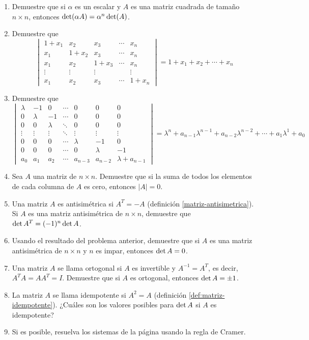 \begin{enumerate}[start=31]
    \item Demuestre que si $\alpha$ es un escalar y $A$ es una matriz cuadrada de tamaño $n \times n$, entonces $\operatorname{det}(\alpha A)=\alpha^n \operatorname{det}(A)$.
    \item Demuestre que
    $$\begin{vmatrix}
        1+x_1 & x_2 & x_3 & \cdots & x_n \\
        x_1 & 1+x_2 & x_3 & \cdots & x_n \\
        x_1 & x_2 & 1+x_3 & \cdots & x_n \\
        \vdots & \vdots & \vdots & & \vdots \\
        x_1 & x_2 & x_3 & \cdots & 1+x_n
    \end{vmatrix} = 1+x_1+x_2+\cdots+x_n$$
    \item Demuestre que
    $$\begin{vmatrix*}
        \lambda & -1 & 0 & \cdots & 0 & 0 & 0 \\
        0 & \lambda & -1 & \cdots & 0 & 0 & 0 \\
        0 & 0 & \lambda & \ddots & 0 & 0 & 0 \\
        \vdots & \vdots & \vdots & \ddots & \vdots & \vdots & \vdots \\
        0 & 0 & 0 & \cdots & \lambda & -1 & 0 \\
        0 & 0 & 0 & \cdots & 0 & \lambda & -1 \\
        a_0 & a_1 & a_2 & \cdots & a_{n-3} & a_{n-2} & \lambda+a_{n-1}
    \end{vmatrix*}=\lambda^n+a_{n-1} \lambda^{n-1}+a_{n-2} \lambda^{n-2}+\cdots+a_1 \lambda^1+a_0$$
    \item Sea $A$ una matriz de $n \times n$. Demuestre que si la suma de todos los elementos de cada columna de $A$ es cero, entonces $|A|=0$.
    \item Una matriz $A$ es antisimétrica si $A^{T}=-A$ (definición \ref{matriz-antisimetrica}). Si $A$ es una matriz antisimétrica de $n \times n$, demuestre que $\operatorname{det} A^{T}=(-1)^n \operatorname{det} A$.
    \item Usando el resultado del problema anterior, demuestre que si $A$ es una matriz antisimétrica de $n \times n$ y $n$ es impar, entonces $\operatorname{det} A=0$.
    \item Una matriz $A$ se llama ortogonal si $A$ es invertible y $A^{-1}=A^{T}$, es decir, $A^{T} A=A A^{T}=I$. Demuestre que si $A$ es ortogonal, entonces $\operatorname{det} A= \pm 1$.
    \item La matriz $A$ se llama idempotente si $A^2 = A$ (definición \ref{def:matriz-idempotente}). ¿Cuáles son los valores posibles para $\operatorname{det} A$ si $A$ es idempotente?
    \item Si es posible, resuelva los sistemas de la página \pageref{EJERCICIOSDECRAMER} usando la regla de Cramer.
\end{enumerate}